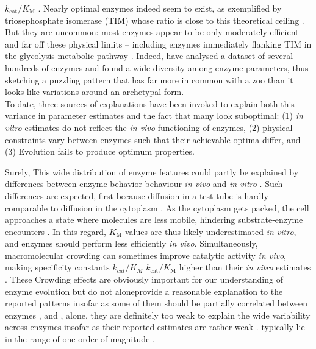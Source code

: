\documentclass[11pt,onecolumn]{article}
\providecommand{\DIFadd}[1]{{\protect\color{blue} \sf #1}} %
\providecommand{\DIFdel}[1]{{\protect\color{red} \scriptsize #1}} %
\providecommand{\DIFaddbegin}{} %
\providecommand{\DIFaddend}{} %
\providecommand{\DIFdelbegin}{} %
\providecommand{\DIFdelend}{} %
\begin{document}
\DIFdelend \DIFaddbegin \DIFadd{${k_\text{cat}}/{K_\text{M}}$  \citep{Alberty58,Zhou82}. }\DIFaddend Nearly optimal enzymes indeed seem to exist, as exemplified by triosephosphate isomerase (TIM) whose ratio is close to this theoretical ceiling \citep{Knowles77}. But they are uncommon: most enzymes appear to be only moderately efficient and far off these physical limits -- including enzymes immediately flanking TIM in the glycolysis metabolic pathway \citep{Davidi18}.
Indeed, \citet{Bar-Even11} have analysed a dataset of several hundreds of enzymes and found a wide diversity among enzyme parameters, thus sketching a puzzling pattern that has far more in common with a zoo than it looks like variations around an archetypal form.\DIFaddbegin \\
\DIFaddend 

\DIFdelbegin \DIFdel{To date, three sources of explanations have been invoked to explain both this variance in parameter estimates and the fact that many look suboptimal: (1) \textit{in vitro} estimates do not reflect the \textit{in vivo} functioning of enzymes, (2) physical constraints vary between enzymes such that their achievable optima differ, and (3) Evolution fails to produce optimum properties.
}%

\DIFdel{Surely, }\DIFdelend \DIFaddbegin \DIFadd{This wide distribution of enzyme features could partly be explained by }\DIFaddend differences between enzyme \DIFdelbegin \DIFdel{behavior }\DIFdelend \DIFaddbegin \DIFadd{behaviour }\DIFaddend \textit{in vivo} and \textit{in vitro}\DIFaddbegin \DIFadd{. Such differences }\DIFaddend are expected, first because diffusion in a test tube is hardly comparable to diffusion in the cytoplasm \citep{Ellis01,Rivas04,Zhou08,Rivas18}. As the cytoplasm gets packed, the cell approaches a state where molecules are less mobile, hindering substrate-enzyme encounters \citep{Muramatsu88,Zimmerman93,Blanco18}. In this regard, $K_\text{M}$ values are \DIFdelbegin \DIFdel{thus }\DIFdelend \DIFaddbegin \DIFadd{likely }\DIFaddend underestimated \textit{in vitro}, and enzymes should perform less efficiently \textit{in vivo}. Simultaneously, macromolecular crowding can sometimes improve catalytic activity \textit{in vivo}, making specificity constants \DIFdelbegin \DIFdel{$k_{cat}/K_M$ }\DIFdelend \DIFaddbegin \DIFadd{$k_\text{cat}/K_\text{M}$ }\DIFaddend higher than their \textit{in vitro} estimates \citep{Ralston90,Ellis01,Jiang07,Pozdnyakova10}. \DIFdelbegin \DIFdel{These }\DIFdelend \DIFaddbegin \DIFadd{Crowding }\DIFaddend effects are obviously important for our understanding of enzyme evolution but\DIFdelbegin \DIFdel{do not aloneprovide a reasonable explanation to the reported patterns insofar as some of them should be partially correlated between enzymes \citep{Tabaka14}, and }\DIFdelend \DIFaddbegin \DIFadd{, alone, they are definitely too weak to explain the wide variability across enzymes insofar as }\DIFaddend their reported estimates \DIFdelbegin \DIFdel{are rather weak \cite{Davidi16}. }\DIFdelend \DIFaddbegin \DIFadd{typically lie in the range of one order of magnitude \citep{Davidi16}. }\\
\DIFaddend 
\end{document}
